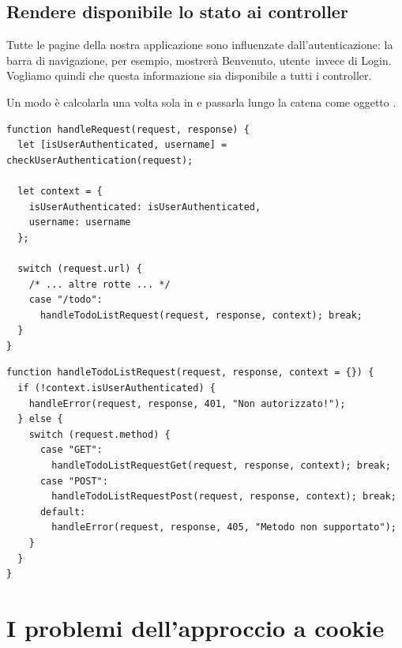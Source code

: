 
\subsection{Rendere disponibile lo stato ai controller}

Tutte le pagine della nostra applicazione sono influenzate dall'autenticazione:
la barra di navigazione, per esempio, mostrerà \guillemotleft Benvenuto, utente\guillemotright\
invece di \guillemotleft Login\guillemotright. Vogliamo quindi che questa informazione sia
disponibile a tutti i controller.

Un modo è calcolarla una volta sola in  e passarla lungo
la catena come oggetto \term{context}.

\begin{lstlisting}[style=js, name=router.js]
function handleRequest(request, response) {
  let [isUserAuthenticated, username] = checkUserAuthentication(request);

  let context = {
    isUserAuthenticated: isUserAuthenticated,
    username: username
  };

  switch (request.url) {
    /* ... altre rotte ... */
    case "/todo":
      handleTodoListRequest(request, response, context); break;
  }
}
\end{lstlisting}

\begin{lstlisting}[style=js, name=todo-controller.js]
function handleTodoListRequest(request, response, context = {}) {
  if (!context.isUserAuthenticated) {
    handleError(request, response, 401, "Non autorizzato!");
  } else {
    switch (request.method) {
      case "GET":
        handleTodoListRequestGet(request, response, context); break;
      case "POST":
        handleTodoListRequestPost(request, response, context); break;
      default:
        handleError(request, response, 405, "Metodo non supportato");
    }
  }
}
\end{lstlisting}

\section{I problemi dell'approccio a cookie}

